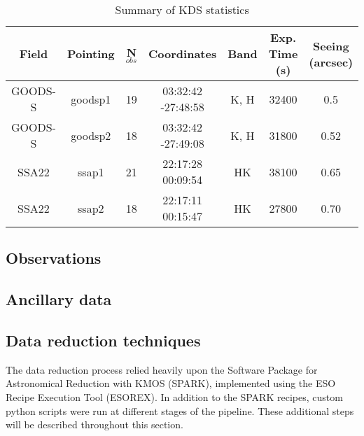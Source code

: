 \documentclass[a4paper,fleqn,usenatbib]{mn2e}
\begin{document}
\begin{table*}
    \centering
\begin{tabular}{ c c c c c c c }

 \hline
Field & Pointing & N$_{obs}$ & Coordinates & Band & Exp. Time (s) & Seeing (arcsec)  \\
 \hline
 GOODS-S & goodsp1 & 19 & 03:32:42 -27:48:58 & K, H & 32400 & 0.5 \\
GOODS-S & goodsp2 & 18 & 03:32:42 -27:49:08 & K, H & 31800 & 0.52 \\
SSA22 & ssap1 & 21 & 22:17:28 00:09:54 & HK & 38100 & 0.65 \\
SSA22 & ssap2 & 18 & 22:17:11 00:15:47 & HK & 27800 & 0.70 \\
 \hline
\end{tabular}
\caption{Summary of KDS statistics}
\label{tab:KDS}
\end{table*}

\subsection{Observations}

\subsection{Ancillary data}

\subsection{Data reduction techniques}
The data reduction process relied heavily upon the Software Package for Astronomical Reduction with KMOS (SPARK), implemented using the ESO Recipe Execution Tool (ESOREX).
In addition to the SPARK recipes, custom python scripts were run at different stages of the pipeline.
These additional steps will be described throughout this section.
\end{document}
